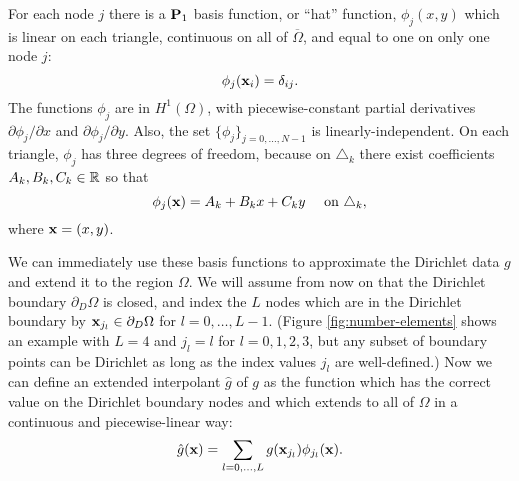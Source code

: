 For each node $j$ there is a $\mathbf{P}_1$ basis function, or ``hat'' function, $\phi_j(x,y)$ which is linear on each triangle, continuous on all of $\overline{\Omega}$, and equal to one on only one node $j$:%
\begin{equation*}
\phi_j(\mathbf{x}_i) = \delta_{ij}.
\end{equation*}
The functions $\phi_j$ are in $H^1(\Omega)$, with piecewise-constant partial derivatives $\partial\phi_j/\partial x$ and $\partial\phi_j/\partial y$.  Also, the set $\{\phi_j\}_{j=0,\dots,N-1}$ is linearly-independent.  On each triangle, $\phi_j$ has three degrees of freedom, because on $\triangle_k$ there exist coefficients $A_k,B_k,C_k\in\mathbb{R}$ so that
\begin{equation*}
\phi_j(\mathbf{x}) = A_k + B_k x + C_k y \quad \text{ on } \triangle_k,
\end{equation*}
where $\mathbf{x} = (x,y)$.

We can immediately use these basis functions to approximate the Dirichlet data $g$ and extend it to the region $\Omega$.  We will assume from now on that the Dirichlet boundary $\partial_D\Omega$ is closed, and index the $L$ nodes which are in the Dirichlet boundary by $\mathbf{x}_{j_l} \in \partial_D\Omega$ for $l=0,\dots,L-1$.  (Figure \ref{fig:number-elements} shows an example with $L=4$ and $j_l=l$ for $l=0,1,2,3$, but any subset of boundary points can be Dirichlet as long as the index values $j_l$ are well-defined.)  Now we can define an extended interpolant $\hat g$ of $g$ as the function which has the correct value on the Dirichlet boundary nodes and which extends to all of $\Omega$ in a continuous and piecewise-linear way:
\begin{equation}
\hat g(\mathbf{x}) = \sum_{l=0,\dots,L} g(\mathbf{x}_{j_l}) \phi_{j_l}(\mathbf{x}). \label{hatgdefine}
\end{equation}

